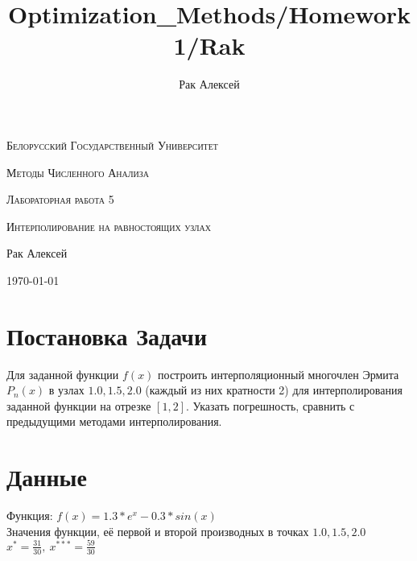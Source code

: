 \documentclass[10pt]{scrartcl}
\begin{document}
\author{Рак Алексей}
\title{Optimization_Methods/Homework1/Rak}
\begin{titlepage}
		\centering
		{\scshape\LARGE Белорусский Государственный Университет \par}
        \vfill
        {\scshape\LARGE Методы Численного Анализа\par}
        \vspace{1cm}
        {\scshape\LARGE Лабораторная работа 5\par}
        \vspace{1cm}
        {\scshape\LARGE Интерполирование на равностоящих узлах\par}
        \vspace{2cm}
        {\LARGE Рак Алексей\par}
        \vfill
        {\large \today}
\end{titlepage}
\section*{Постановка Задачи}\noindent
Для заданной функции $f(x)$ построить интерполяционный многочлен Эрмита $P_n(x)$ в узлах $1.0, 1.5, 2.0$ (каждый из них кратности 2) для интерполирования заданной функции на отрезке $[1, 2]$. Указать
погрешность, сравнить с предыдущими методами интерполирования.
\section*{Данные}\noindent
Функция: $f(x) = 1.3 * e^x - 0.3 * sin(x)$\\
Значения функции, её первой и второй производных в точках $1.0, 1.5, 2.0$
$x^{*} = \frac{31}{30}, \ x^{***} = \frac{59}{30}$
\end{document}
